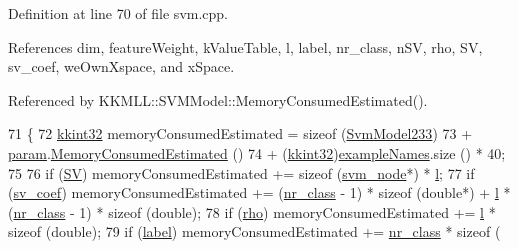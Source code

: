Definition at line 70 of file svm.\+cpp.



References dim, feature\+Weight, k\+Value\+Table, l, label, nr\+\_\+class, n\+SV, rho, SV, sv\+\_\+coef, we\+Own\+Xspace, and x\+Space.



Referenced by K\+K\+M\+L\+L\+::\+S\+V\+M\+Model\+::\+Memory\+Consumed\+Estimated().


\begin{DoxyCode}
71 \{
72   \hyperlink{namespace_k_k_b_a8fa4952cc84fda1de4bec1fbdd8d5b1b}{kkint32}  memoryConsumedEstimated = \textcolor{keyword}{sizeof} (\hyperlink{struct_s_v_m233_1_1_svm_model233_a67c96f5c91cbeccfe31b480229e54045}{SvmModel233})
73     +  \hyperlink{struct_s_v_m233_1_1_svm_model233_aea9d5d416f02777981c7677da2044571}{param}.\hyperlink{struct_s_v_m233_1_1svm__parameter_af7bd0cda5d8fd766b61ba2602f71fc1b}{MemoryConsumedEstimated} ()
74     +  (\hyperlink{namespace_k_k_b_a8fa4952cc84fda1de4bec1fbdd8d5b1b}{kkint32})\hyperlink{struct_s_v_m233_1_1_svm_model233_afa332c55cdafdab8746f38c85fb22741}{exampleNames}.size () * 40;
75 
76   \textcolor{keywordflow}{if}  (\hyperlink{struct_s_v_m233_1_1_svm_model233_a97dd1118f0bf7803ad6f4d952a56d06b}{SV})             memoryConsumedEstimated  += \textcolor{keyword}{sizeof} (\hyperlink{struct_s_v_m233_1_1svm__node}{svm\_node}*) * 
      \hyperlink{struct_s_v_m233_1_1_svm_model233_ae37947940a05ecebb1352b6f365b4050}{l};
77   \textcolor{keywordflow}{if}  (\hyperlink{struct_s_v_m233_1_1_svm_model233_ac60e898fcd1028cc699269ef5995df06}{sv\_coef})        memoryConsumedEstimated  += (\hyperlink{struct_s_v_m233_1_1_svm_model233_a55a9d2b4d87f50f14dfdcc1afc65b47b}{nr\_class} - 1) * \textcolor{keyword}{sizeof} (\textcolor{keywordtype}{double}*) + 
      \hyperlink{struct_s_v_m233_1_1_svm_model233_ae37947940a05ecebb1352b6f365b4050}{l} * (\hyperlink{struct_s_v_m233_1_1_svm_model233_a55a9d2b4d87f50f14dfdcc1afc65b47b}{nr\_class} - 1) * \textcolor{keyword}{sizeof} (\textcolor{keywordtype}{double});
78   \textcolor{keywordflow}{if}  (\hyperlink{struct_s_v_m233_1_1_svm_model233_abefa926355c127596d8cd576888a0f0c}{rho})            memoryConsumedEstimated  += \hyperlink{struct_s_v_m233_1_1_svm_model233_ae37947940a05ecebb1352b6f365b4050}{l} * \textcolor{keyword}{sizeof} (double);
79   \textcolor{keywordflow}{if}  (\hyperlink{struct_s_v_m233_1_1_svm_model233_a36d0c9e4a7019a0de64fc8661cc10bf3}{label})          memoryConsumedEstimated  += \hyperlink{struct_s_v_m233_1_1_svm_model233_a55a9d2b4d87f50f14dfdcc1afc65b47b}{nr\_class} * \textcolor{keyword}{sizeof} (

\end{DoxyCode}
